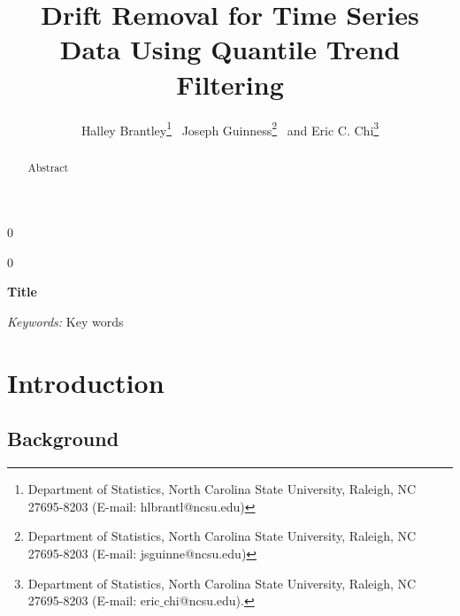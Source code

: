 \documentclass[12pt]{article}
\newcommand{\blind}{0}
\numberwithin{equation}{section}
\theoremstyle{plain}
\begin{document}
\def\spacingset#1{\renewcommand{\baselinestretch}%
{#1}\small\normalsize} \spacingset{1}



\blind
{
  \title{\bf Drift Removal for Time Series Data Using Quantile Trend Filtering}
  \author{Halley Brantley\thanks{
    Department of Statistics, North Carolina State University, Raleigh, NC 27695-8203 (E-mail: hlbrantl@ncsu.edu)} \,
         Joseph Guinness\thanks{
    Department of Statistics, North Carolina State University, Raleigh, NC 27695-8203 (E-mail: jsguinne@ncsu.edu)} \,
    and
    Eric C. Chi\thanks{Department of Statistics, North Carolina State University, Raleigh, NC 27695-8203 (E-mail: eric$\_$chi@ncsu.edu).}    \\}
    \date{}
  \maketitle
} \fi

\blind
{
  \bigskip
  \bigskip
  \bigskip
  \begin{center}
    {\LARGE\bf Title}
\end{center}
  \medskip
} \fi

\bigskip
\begin{abstract}
Abstract
\end{abstract}

\noindent%
{\it Keywords:}  Key words
\vfill

\newpage
\spacingset{1.45} %
\section{Introduction}

\subsection{Background}
\end{document}
